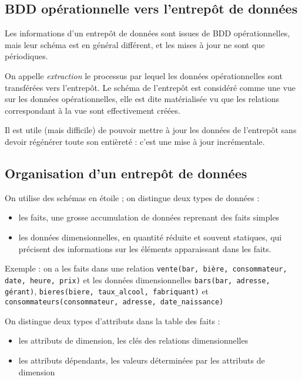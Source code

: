 	
		\subsection{BDD opérationnelle vers l'entrepôt de données}
		
		Les informations d'un entrepôt de données sont issues de BDD opérationnelles, mais leur schéma est en général différent, et les mises à jour ne sont que périodiques.
		
		On appelle \textit{extraction} le processus par lequel les données opérationnelles sont transférées vers l'entrepôt. Le schéma de l'entrepôt est considéré comme une vue sur les données opérationnelles, elle est dite matérialisée vu que les relations correspondant à la vue sont effectivement créées. 
		
		Il est utile (mais difficile) de pouvoir mettre à jour les données de l'entrepôt sans devoir régénérer toute son entièreté : c'est une mise à jour incrémentale.
	
		\subsection{Organisation d'un entrepôt de données}
		
		On utilise des schémas en étoile  ; on distingue deux types de données :
		
		\begin{itemize}
			\item les faits, une grosse accumulation de données reprenant des faits simples
			\item les données dimensionnelles, en quantité réduite et souvent statiques, qui précisent des informations sur les éléments apparaissant dans les faits.
		\end{itemize}
	
		Exemple : on a les faits dans une relation \texttt{vente(bar, bière, consommateur, date, heure, prix)} et les données dimensionnelles \texttt{bars(bar, adresse, gérant)}, \texttt{bieres(biere, taux\_alcool, fabriquant)} et \texttt{consommateurs(consommateur, adresse, date\_naissance)}
		
		On distingue deux types d'attributs dans la table des faits :
		
		\begin{itemize}
			\item les attributs de dimension, les clés des relations dimensionnelles
			\item les attributs dépendants, les valeurs déterminées par les attributs de dimension
		\end{itemize}
		
